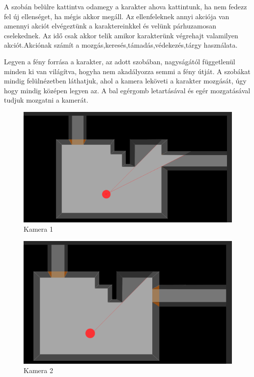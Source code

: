 
A szobán belülre kattintva odamegy a karakter ahova kattintunk, ha nem fedezz fel új ellenséget, ha mégis akkor megáll.
Az ellenfeleknek annyi akciója van amennyi akciót elvégeztünk a karaktereinkkel és velünk párhuzamosan cselekednek.
Az idő csak akkor telik amikor karakterünk végrehajt valamilyen akciót.Akciónak számít a mozgás,keresés,támadás,védekezés,tárgy használata.


Legyen a fény forrása a karakter, az adott szobában, nagyságától függetlenül minden ki van világítva, hogyha nem akadályozza semmi a fény útját.
A szobákat mindig felülnézetben láthatjuk, ahol a kamera leköveti a karakter mozgását, úgy hogy mindig középen legyen az.
A bal egérgomb letartásával és egér mozgatásával tudjuk mozgatni a kamerát.

\begin{figure}[h]
	\centering
	\includegraphics[scale=1]{images/image6.png}
	\caption{Kamera 1}
	\label{fig:camera1}
\end{figure}

\begin{figure}[h]
	\centering
	\includegraphics[scale=1]{images/image7.png}
	\caption{Kamera 2}
	\label{fig:camera2}
\end{figure}

